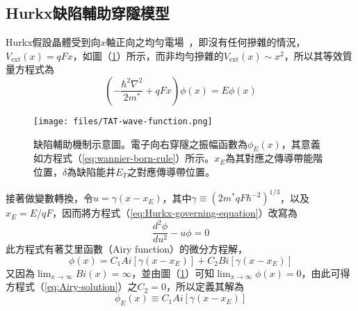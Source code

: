\subsection{Hurkx缺陷輔助穿隧模型}\label{cs:Hurkx-TAT-model}
Hurkx假設晶體受到向$x$軸正向之均勻電場~\cite{hurkx1989modelling}，即沒有任何摻雜的情況，$V_\text{ext}(x)=qFx$，如圖（\ref{fig:TAT-wave-function}）所示，而非均勻摻雜的$V_\text{ext}(x)\sim x^2$，所以其等效質量方程式為
\begin{equation}
\label{eq:Hurkx-governing-equation}
\left(-\frac{\hbar^2\nabla^2}{2m^*}+qFx\right)\phi(x)=E\phi(x)
\end{equation}
\begin{figure}[h]
\centering
\texttt{[image: files/TAT-wave-function.png]}
\caption[缺陷輔助穿隧機制示意圖(2)]{缺陷輔助機制示意圖。電子向右穿隧之振幅函數為$\phi_E(x)$，其意義如方程式（\ref{eq:wannier-born-rule}）所示。$x_E$為其對應之傳導帶能階位置，$\delta$為缺陷能井$E_T$之對應傳導帶位置。}
\label{fig:TAT-wave-function}
\end{figure}
接著做變數轉換，令$u=\gamma(x-x_E)$，其中$\gamma\equiv \left(2m^*qF\hbar^{-2}\right)^{1/3}$，以及$x_E=E/qF$，因而將方程式（\ref{eq:Hurkx-governing-equation}）改寫為
\begin{equation}
\frac{d^2\phi}{du^2}-u\phi=0
\end{equation}
此方程式有著艾里函數（Airy function）的微分方程解，
\begin{equation}
\label{eq:Airy-solution}
\phi(x)=C_1Ai\left[\gamma(x-x_E)\right]+C_2Bi\left[\gamma(x-x_E)\right]
\end{equation}
又因為$\lim_{x\to\infty}Bi(x)=\infty$，並由圖（\ref{fig:TAT-wave-function}）可知$\lim_{x\to\infty}\phi(x)=0$，由此可得方程式（\ref{eq:Airy-solution}）之$C_2=0$，所以定義其解為
\begin{equation}
\label{eq:phi_E_solution}
\phi_E(x)\equiv C_1Ai\left[\gamma(x-x_E)\right]
\end{equation}
